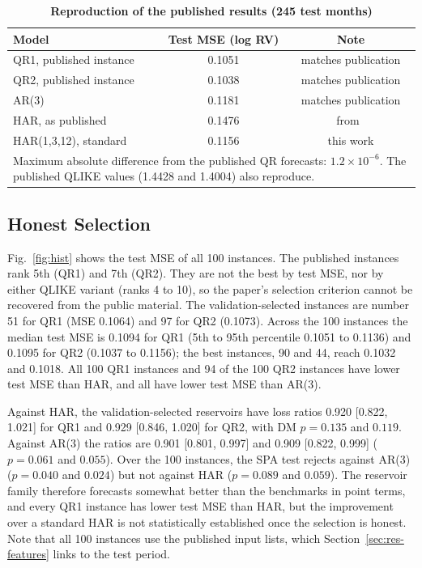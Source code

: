 \documentclass{ieeeaccess}
\begin{document}
\begin{table}[t]
\caption{\textbf{Reproduction of the published results (245 test months)}}
\label{tab:repro}
\setlength{\tabcolsep}{4pt}
\begin{tabular}{|l|c|c|}
\hline
Model & Test MSE (log RV) & Note\\
\hline
QR1, published instance & 0.1051 & matches publication\\
QR2, published instance & 0.1038 & matches publication\\
AR(3) & 0.1181 & matches publication\\
HAR, as published & 0.1476 & from~\cite{li2026}\\
HAR(1,3,12), standard & 0.1156 & this work\\
\hline
\multicolumn{3}{p{230pt}}{Maximum absolute difference from the published QR forecasts: $1.2\times10^{-6}$. The published QLIKE values (1.4428 and 1.4004) also reproduce.}\\
\end{tabular}
\end{table}

\subsection{Honest Selection}
\label{sec:res-select}
Fig.~\ref{fig:hist} shows the test MSE of all 100 instances. The published instances rank 5th (QR1) and 7th (QR2). They are not the best by test MSE, nor by either QLIKE variant (ranks 4 to 10), so the paper's selection criterion cannot be recovered from the public material. The validation-selected instances are number 51 for QR1 (MSE 0.1064) and 97 for QR2 (0.1073). Across the 100 instances the median test MSE is 0.1094 for QR1 (5th to 95th percentile 0.1051 to 0.1136) and 0.1095 for QR2 (0.1037 to 0.1156); the best instances, 90 and 44, reach 0.1032 and 0.1018. All 100 QR1 instances and 94 of the 100 QR2 instances have lower test MSE than HAR, and all have lower test MSE than AR(3).

Against HAR, the validation-selected reservoirs have loss ratios 0.920 [0.822, 1.021] for QR1 and 0.929 [0.846, 1.020] for QR2, with DM $p=0.135$ and $0.119$. Against AR(3) the ratios are 0.901 [0.801, 0.997] and 0.909 [0.822, 0.999] ($p=0.061$ and $0.055$). Over the 100 instances, the SPA test rejects against AR(3) ($p=0.040$ and $0.024$) but not against HAR ($p=0.089$ and $0.059$). The reservoir family therefore forecasts somewhat better than the benchmarks in point terms, and every QR1 instance has lower test MSE than HAR, but the improvement over a standard HAR is not statistically established once the selection is honest. Note that all 100 instances use the published input lists, which Section~\ref{sec:res-features} links to the test period.
\end{document}
